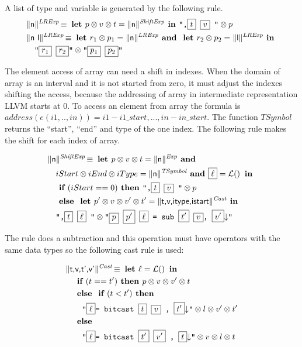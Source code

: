 A list of type and variable is generated by the following rule.
\begin{align*}
&\trad{n}{LRExp} \isdef \LET p \sep v \sep t  = \trad{n}{ShiftExp}  \IN  \llvm{",\PH{t} \PH{v} "} \sep p\\
&\trad{n l}{LRExp} \isdef \LET r_1 \sep p_1 = \trad{n}{LRExp} \AND
 \LET r_2 \sep p_2 = \trad{l}{LRExp} \IN\\
& \quad  \llvm{"\PH{r_1} \PH{r_2}"} \sep \llvm{"\PH{p_1} \PH{p_2}"}\\
\end{align*}


The element access of array can need a shift in indexes. When the domain of 
array is an interval and it is not started from zero, it must adjust the 
indexes shifting the access, because the addressing  of array in intermediate 
representation LLVM starts at 0. To access an element from array the formula is 
$address(e(i1,..,in))  = i1-i1\_start, ... , in-in\_start$. The function $TSymbol$
returns the ``start'', ``end'' and type of the one index. The following rule 
makes the shift for each index of array.

\begin{align*}
&\trad{n}{ShiftExp} \isdef \LET p \sep v \sep t  = \trad{n}{Exp} \AND \\
&\quad iStart \sep iEnd \sep iType = \trad{n}{TSymbol}  \AND  \PH{\ell} = \lbl \IN \\
&\quad \IF ( iStart == 0 ) \THEN  \llvm{",\PH{t} \PH{v} "} \sep p \\
&\quad \ELSE \LET  p' \sep v \sep v' \sep t'  = \trad{t,v,itype,istart}{Cast} \IN \\
&\quad \llvm{",\PH{t} \PH{\ell} "} \sep  \llvm{"\PH{p} \PH{p'}  \PH{\ell} = sub \PH{t'} \PH{v}, \PH{v'}\nl"}  \\
\end{align*}

The  rule does a subtraction and this operation must have operators with the same data types so the following cast rule is used:

\begin{align*}
&\trad{t,v,t',v'}{Cast} \isdef \LET  \ell = \lbl \IN \\
&\quad \IF ( t == t') \THEN p \sep v \sep v' \sep t  \\
&\quad \ELSE \IF (t<t') \THEN \\
&\quad \quad \llvm{"\PH{\ell}= bitcast \PH{t} \PH{v} , \PH{t'}\nl"}  \sep l \sep v' \sep t'\\ 
&\quad \ELSE \\ 
&\quad \quad \llvm{"\PH{\ell}= bitcast \PH{t'} \PH{v'} , \PH{t}\nl"} \sep v \sep l \sep t \\ 
\end{align*}


